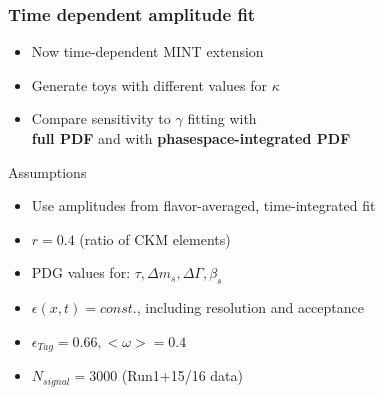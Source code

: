 \documentclass[]{beamer}
\begin{document}
\begin{frame}
	\frametitle{Time dependent amplitude fit}

	\centering
	
	\begin{block}{}
	\begin{itemize}
		\item  Now time-dependent MINT extension
		\item Generate toys with different values for $\kappa$ 
		\item Compare sensitivity to $\gamma$ fitting with \\ \textbf{full PDF} and with \textbf{phasespace-integrated PDF}
		\end{itemize}
	\end{block}		
		
	\begin{block}{Assumptions}
	\begin{itemize}	
		\item Use amplitudes from flavor-averaged, time-integrated fit
		\item $r = 0.4$ (ratio of CKM elements) 
		\item PDG values for: $\tau,\Delta m_s, \Delta \Gamma, \beta_s$
		\item $\epsilon(x,t) = const.$, including resolution and acceptance   
		\item $\epsilon_{Tag} = 0.66, <\omega> = 0.4 $   
		\item $N_{signal} = 3000$ (Run1+15/16 data)		 
	\end{itemize}
	\end{block}	
			

\end{frame}
\end{document}
